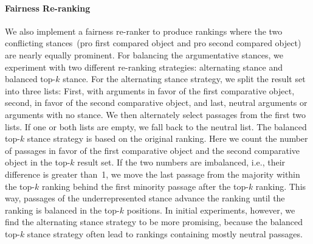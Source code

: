 \paragraph{Fairness Re-ranking}

We also implement a fairness re-ranker to produce rankings where the two conflicting stances~(pro first compared object and pro second compared object) are nearly equally prominent.
For balancing the argumentative stances, we experiment with two different re-ranking strategies: \Ni alternating stance and \Nii balanced top-\(k\) stance.
For the alternating stance strategy, we split the result set into three lists: First, with arguments in favor of the first comparative object, second, in favor of the second comparative object, and last, neutral arguments or arguments with no stance.
We then alternately select passages from the first two lists. If one or both lists are empty, we fall back to the neutral list.
The balanced top-\(k\) stance strategy is based on the original ranking.
Here we count the number of passages in favor of the first comparative object and the second comparative object in the top-\(k\) result set.
If the two numbers are imbalanced, i.e., their difference is greater than~1, we move the last passage from the majority within the top-\(k\) ranking behind the first minority passage after the top-\(k\) ranking.
This way, passages of the underrepresented stance advance the ranking until the ranking is balanced in the top-\(k\) positions.
In initial experiments, however, we find the alternating stance strategy to be more promising, because the balanced top-\(k\) stance strategy often lead to rankings containing mostly neutral passages.
